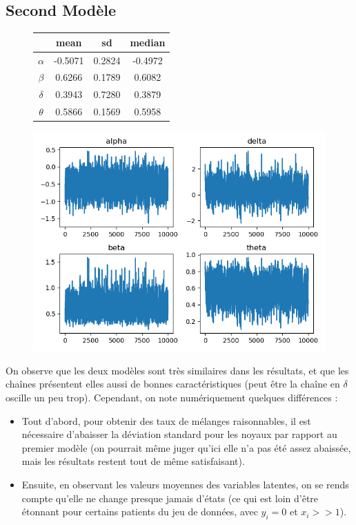 \subsection{Second Modèle}

\begin{figure}[H]
\begin{minipage}{0.4\linewidth}
    \begin{center}
    \begin{tabular}{c | c  c  c}
    & mean & sd & median \\
    \hline
    $\alpha$ & -0.5071  &  0.2824  & -0.4972 \\
    $\beta$ & 0.6266   & 0.1789  &  0.6082 \\
    $\delta$ & 0.3943  &  0.7280 &   0.3879 \\
    $\theta$ & 0.5866  &  0.1569  &  0.5958 \\
    \end{tabular}
    \end{center}
\end{minipage}
\hfill
\begin{minipage}{0.5\linewidth}
    \includegraphics[width=1\linewidth]{figure/model2.png}
\end{minipage}
\end{figure}

On observe que les deux modèles sont très similaires dans les résultats, et que les chaînes présentent elles aussi de bonnes caractéristiques (peut être la chaîne en $\delta$ oscille un peu trop). Cependant, on note numériquement quelques différences : 
\begin{itemize}
    \item Tout d'abord, pour obtenir des taux de mélanges raisonnables, il est nécessaire d’abaisser la déviation standard pour les noyaux par rapport au premier modèle (on pourrait même juger qu'ici elle n'a pas été assez abaissée, mais les résultats restent tout de même satisfaisant).
    \item Ensuite, en observant les valeurs moyennes des variables latentes, on se rends compte qu'elle ne change presque jamais d'états (ce qui est loin d'être étonnant pour certains patients du jeu de données, avec $y_i =0 $ et $x_i >> 1$).
\end{itemize}

